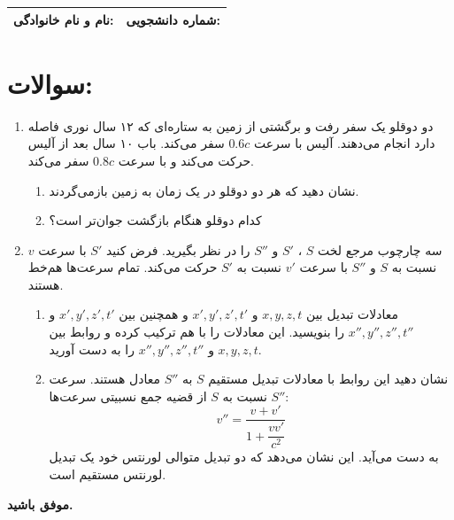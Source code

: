 \documentclass[12pt,a4paper]{article}
\begin{document}
	
	\begin{tabular}{|p{7cm}|p{7cm}|}
		\hline
		\textbf{نام و نام خانوادگی:} & \textbf{شماره دانشجویی:} \\
		\hline
	\end{tabular}
	
	
	\section*{سوالات:}
	\begin{enumerate}
		\item 
		دو دوقلو یک سفر رفت و برگشتی از زمین به ستاره‌ای که ۱۲ سال نوری فاصله دارد انجام می‌دهند. آلیس با سرعت \(0.6c\) سفر می‌کند. باب ۱۰ سال بعد از آلیس حرکت می‌کند و با سرعت \(0.8c\) سفر می‌کند.
		\begin{enumerate}
			\item[(الف)] نشان دهید که هر دو دوقلو در یک زمان به زمین بازمی‌گردند.
			\item[(ب)] کدام دوقلو هنگام بازگشت جوان‌تر است؟
		\end{enumerate}
		
		\item 
		سه چارچوب مرجع لخت \( S \) ، \( S' \) و \( S'' \) را در نظر بگیرید. فرض کنید \( S' \) با سرعت \( v \) نسبت به \( S \) و \( S'' \) با سرعت \( v' \) نسبت به \( S' \) حرکت می‌کند. تمام سرعت‌ها هم‌خط هستند.
		\begin{enumerate}
			\item[(الف)] معادلات تبدیل بین \( x, y, z, t \) و \( x', y', z', t' \) و همچنین بین \( x', y', z', t' \) و \( x'', y'', z'', t'' \) را بنویسید. این معادلات را با هم ترکیب کرده و روابط بین \( x, y, z, t \) و \( x'', y'', z'', t'' \) را به دست آورید.
			
			\item[(ب)] نشان دهید این روابط با معادلات تبدیل مستقیم \( S \) به \( S'' \) معادل هستند. سرعت \( S'' \) نسبت به \( S \) از قضیه جمع نسبیتی سرعت‌ها:
			\[
			v'' = \frac{v + v'}{1 + \dfrac{v v'}{c^2}}
			\]
			به دست می‌آید. این نشان می‌دهد که دو تبدیل متوالی لورنتس خود یک تبدیل لورنتس مستقیم است.
		\end{enumerate}
		\end{enumerate}
		
		\vspace{10pt}
		\textbf{موفق باشید.}
		
	
\end{document}

